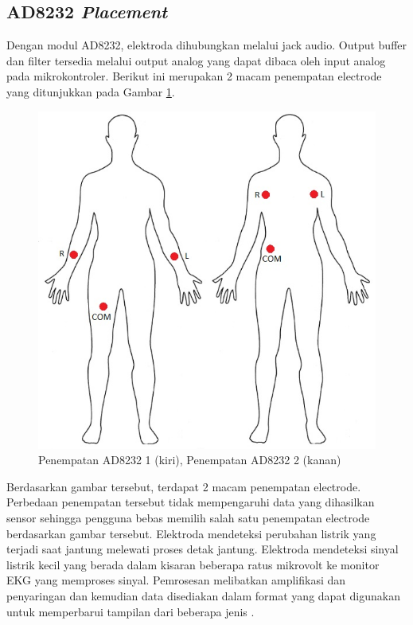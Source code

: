 \vspace{1ex}

\subsection{AD8232 \textit{Placement}}
\vspace{1ex}

Dengan modul AD8232, elektroda dihubungkan melalui jack audio. Output buffer dan filter tersedia melalui output analog yang dapat dibaca oleh input analog pada mikrokontroler. Berikut ini merupakan 2 macam penempatan electrode yang ditunjukkan pada Gambar \ref{fig:2.1.0}.
\begin{figure}[H]
	\begin{center}\centering
		\includegraphics[scale=0.5]{img/AD8232-Electrode-Placement-1}
		\caption{Penempatan AD8232 1 (kiri), Penempatan AD8232 2 (kanan)}
		\label{fig:2.1.0}
	\end{center}
\end{figure}
Berdasarkan gambar tersebut, terdapat 2 macam penempatan electrode. Perbedaan penempatan tersebut tidak mempengaruhi data yang dihasilkan sensor sehingga pengguna bebas memilih salah satu penempatan electrode berdasarkan gambar tersebut.
Elektroda mendeteksi perubahan listrik yang terjadi saat jantung melewati proses detak jantung. Elektroda mendeteksi sinyal listrik kecil yang berada dalam kisaran beberapa ratus mikrovolt ke monitor EKG yang memproses sinyal. Pemrosesan melibatkan amplifikasi dan penyaringan dan kemudian data disediakan dalam format yang dapat digunakan untuk memperbarui tampilan dari beberapa jenis \cite{cit:22}.
\vspace{1ex}

